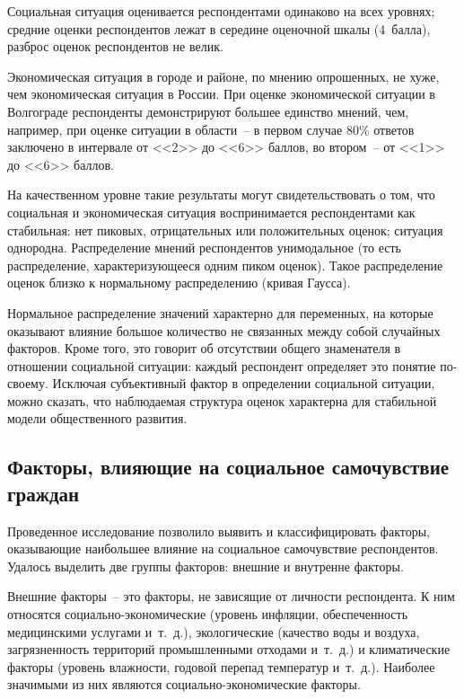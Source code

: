   Социальная ситуация оценивается респондентами одинаково на всех уровнях;
  средние оценки респондентов лежат в середине оценочной шкалы (4~балла),
  разброс оценок респондентов не велик.
  
  Экономическая ситуация в городе и районе, по мнению опрошенных, не хуже, чем
  экономическая ситуация в России. При оценке экономической ситуации в
  Волгограде респонденты демонстрируют большее единство мнений, чем, например,
  при оценке ситуации в области~-- в первом случае 80\% ответов заключено в
  интервале от <<2>> до <<6>> баллов, во втором~-- от <<1>> до <<6>> баллов.
  
  На качественном уровне такие результаты могут свидетельствовать о том, что
  социальная и экономическая ситуация воспринимается респондентами как
  стабильная: нет пиковых, отрицательных или положительных оценок; ситуация
  однородна. Распределение мнений респондентов унимодальное (то есть
  распределение, характеризующееся одним пиком оценок). Такое распределение
  оценок близко к нормальному распределению (кривая Гаусса).
  
  Нормальное распределение значений характерно для переменных, на которые
  оказывают влияние большое количество не связанных между собой случайных
  факторов. Кроме того, это говорит об отсутствии общего знаменателя в
  отношении социальной ситуации: каждый респондент определяет это понятие
  по-своему. Исключая субъективный фактор в определении социальной ситуации,
  можно сказать, что наблюдаемая структура оценок характерна для стабильной
  модели общественного развития.
  
  \subsection{Факторы, влияющие на социальное самочувствие граждан}
  
  Проведенное исследование позволило выявить и классифицировать факторы,
  оказывающие наибольшее влияние на социальное самочувствие респондентов.
  Удалось выделить две группы факторов: внешние и внутренне факторы.
  
  Внешние факторы~-- это факторы, не зависящие от личности респондента. К ним
  относятся социально-экономические (уровень инфляции, обеспеченность
  медицинскими услугами и~т.~д.), экологические (качество воды и воздуха,
  загрязненность территорий промышленными отходами и~т.~д.) и климатические
  факторы (уровень влажности, годовой перепад температур и~т.~д.). Наиболее
  значимыми из них являются социально-экономические факторы.
  
